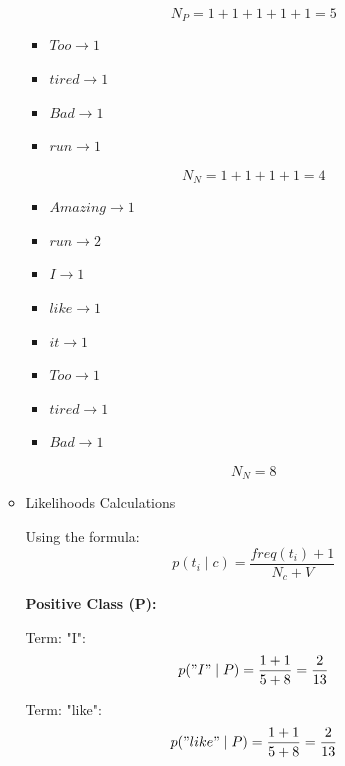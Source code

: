 \documentclass[12pt]{article}
\begin{document}
\begin{enumerate}[leftmargin=\labelsep, label=\textbf{\arabic*.)}]
\begin{itemize}
                    \[
                        N_P = 1 + 1 + 1 + 1 + 1 = 5
                    \]

                    \begin{itemize}
                        \item \( Too \rightarrow 1\)
                        \item \( tired \rightarrow 1\)
                        \item \( Bad \rightarrow 1\)
                        \item \( run \rightarrow 1\)
                    \end{itemize}

                    \[
                        N_N = 1 + 1 + 1 + 1 = 4
                    \]

                    \begin{itemize}
                        \item \( Amazing \rightarrow 1\)
                        \item \( run \rightarrow 2\)
                        \item \( I \rightarrow 1\)
                        \item \( like \rightarrow 1\)
                        \item \( it \rightarrow 1\)
                        \item \( Too \rightarrow 1\)
                        \item \( tired \rightarrow 1\)
                        \item \( Bad \rightarrow 1\)
                    \end{itemize}

                    \[
                        N_N = 8
                    \]

              \item Likelihoods Calculations

                    Using the formula:
                    \[
                        p(t_i \mid c) = \frac{freq(t_i) + 1}{N_c + V}
                    \]

                    \textbf{Positive Class (P):}

                    Term: "I":
                    \[
                        p("I" \mid P) = \frac{1 + 1}{5 + 8} = \frac{2}{13}
                    \]

                    Term: "like":
                    \[
                        p("like" \mid P) = \frac{1 + 1}{5 + 8} = \frac{2}{13}
                    \]


\end{itemize}
\end{enumerate}
\end{document}
